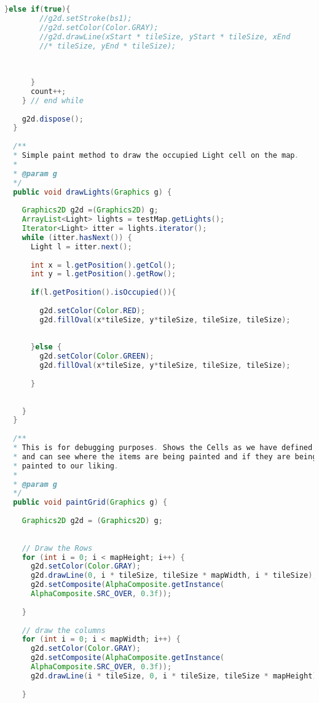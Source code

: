 \begin{lstlisting}[language=java]
      }else if(true){
        //g2d.setStroke(bs1);
        //g2d.setColor(Color.GRAY);
        //g2d.drawLine(xStart * tileSize, yStart * tileSize, xEnd
        //* tileSize, yEnd * tileSize);
        
        
        
      }
      count++;
    } // end while
    
    g2d.dispose();
  }
  
  /**
  * Simple paint method to draw the occupied Light cell on the map.
  * 
  * @param g
  */
  public void drawLights(Graphics g) {
    
    Graphics2D g2d =(Graphics2D) g;  
    ArrayList<Light> lights = testMap.getLights();
    Iterator<Light> itter = lights.iterator();
    while (itter.hasNext()) {
      Light l = itter.next();
      
      int x = l.getPosition().getCol();
      int y = l.getPosition().getRow();
      
      if(l.getPosition().isOccupied()){
        
        g2d.setColor(Color.RED);
        g2d.fillOval(x*tileSize, y*tileSize, tileSize, tileSize);
        
        
      }else {
        g2d.setColor(Color.GREEN);
        g2d.fillOval(x*tileSize, y*tileSize, tileSize, tileSize);
        
      }
      
      
    }
  }
  
  /**
  * This is for debugging purposes. Shows the Cells as we have defined them
  * and can see where the items are being painted and if they are being
  * painted to our liking.
  * 
  * @param g
  */
  public void paintGrid(Graphics g) {
    
    Graphics2D g2d = (Graphics2D) g;
    
    
    // Draw the Rows
    for (int i = 0; i < mapHeight; i++) {
      g2d.setColor(Color.GRAY);
      g2d.drawLine(0, i * tileSize, tileSize * mapWidth, i * tileSize);
      g2d.setComposite(AlphaComposite.getInstance(
      AlphaComposite.SRC_OVER, 0.3f));
      
    }
    
    // draw the columns
    for (int i = 0; i < mapWidth; i++) {
      g2d.setColor(Color.GRAY);
      g2d.setComposite(AlphaComposite.getInstance(
      AlphaComposite.SRC_OVER, 0.3f));
      g2d.drawLine(i * tileSize, 0, i * tileSize, tileSize * mapHeight);
      
    }
    

\end{lstlisting}

